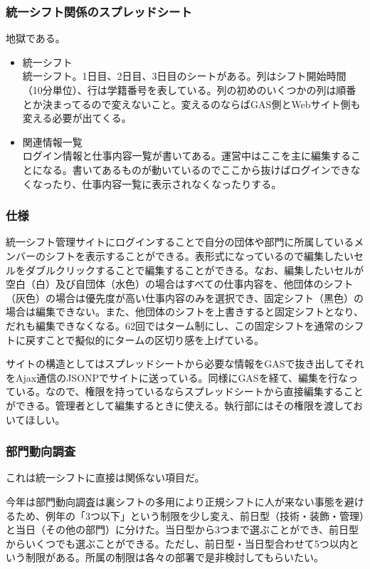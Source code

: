 \documentclass[dvipdfmx,jb5]{jarticle}
\begin{document}
  \subsubsection{統一シフト関係のスプレッドシート}
  地獄である。
  \begin{itemize}
  \item 統一シフト\\
  統一シフト。1日目、2日目、3日目のシートがある。列はシフト開始時間（10分単位）、行は学籍番号を表している。列の初めのいくつかの列は順番とか決まってるので変えないこと。変えるのならばGAS側とWebサイト側も変える必要が出てくる。
  \item 関連情報一覧\\
  ログイン情報と仕事内容一覧が書いてある。運営中はここを主に編集することになる。書いてあるものが動いているのでここから抜けばログインできなくなったり、仕事内容一覧に表示されなくなったりする。
  \end{itemize}
 \subsubsection{仕様}
 統一シフト管理サイトにログインすることで自分の団体や部門に所属しているメンバーのシフトを表示することができる。表形式になっているので編集したいセルをダブルクリックすることで編集することができる。なお、編集したいセルが空白（白）及び自団体（水色）の場合はすべての仕事内容を、他団体のシフト（灰色）の場合は優先度が高い仕事内容のみを選択でき、固定シフト（黒色）の場合は編集できない。また、他団体のシフトを上書きすると固定シフトとなり、だれも編集できなくなる。62回ではターム制にし、この固定シフトを通常のシフトに戻すことで擬似的にタームの区切り感を上げている。

 サイトの構造としてはスプレッドシートから必要な情報をGASで抜き出してそれをAjax通信のJSONPでサイトに送っている。同様にGASを経て、編集を行なっている。なので、権限を持っているならスプレッドシートから直接編集することができる。管理者として編集するときに使える。執行部にはその権限を渡しておいてほしい。

 \subsubsection{部門動向調査}\label{sec:統一シフト-部門動向調査}
 これは統一シフトに直接は関係ない項目だ。

 今年は部門動向調査は裏シフトの多用により正規シフトに人が来ない事態を避けるため、例年の「3つ以下」という制限を少し変え、前日型（技術・装飾・管理）と当日（その他の部門）に分けた。当日型から3つまで選ぶことができ、前日型からいくつでも選ぶことができる。ただし、前日型・当日型合わせて5つ以内という制限がある。所属の制限は各々の部署で是非検討してもらいたい。
\end{document}

